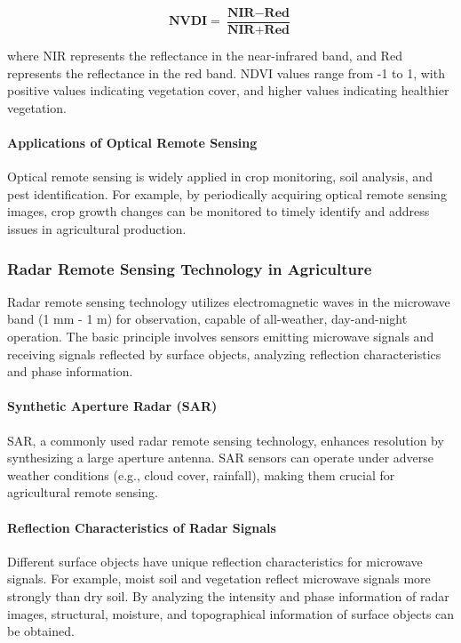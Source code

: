 \begin{equation}
        \textbf{NVDI} = \frac{\textbf{NIR}-\textbf{Red}}{\textbf{NIR}+\textbf{Red}}
        \label{formula:NVDI}
\end{equation}

where NIR represents the reflectance in the near-infrared band, and Red represents the reflectance in the red band. NDVI values range from -1 to 1, with positive values indicating vegetation cover, and higher values indicating healthier vegetation.

\paragraph{Applications of Optical Remote Sensing} Optical remote sensing is widely applied in crop monitoring, soil analysis, and pest identification. For example, by periodically acquiring optical remote sensing images, crop growth changes can be monitored to timely identify and address issues in agricultural production.

\subsubsection{Radar Remote Sensing Technology in Agriculture}

Radar remote sensing technology utilizes electromagnetic waves in the microwave band (1 mm - 1 m) for observation, capable of all-weather, day-and-night operation. The basic principle involves sensors emitting microwave signals and receiving signals reflected by surface objects, analyzing reflection characteristics and phase information.

\paragraph{Synthetic Aperture Radar (SAR)} SAR, a commonly used radar remote sensing technology, enhances resolution by synthesizing a large aperture antenna. SAR sensors can operate under adverse weather conditions (e.g., cloud cover, rainfall), making them crucial for agricultural remote sensing.

\paragraph{Reflection Characteristics of Radar Signals} Different surface objects have unique reflection characteristics for microwave signals. For example, moist soil and vegetation reflect microwave signals more strongly than dry soil. By analyzing the intensity and phase information of radar images, structural, moisture, and topographical information of surface objects can be obtained.

